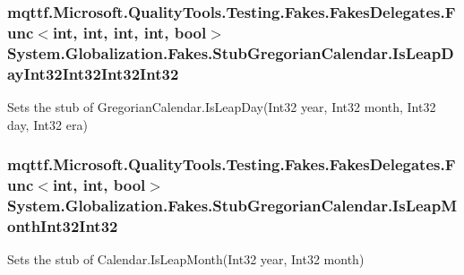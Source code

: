 \hypertarget{class_system_1_1_globalization_1_1_fakes_1_1_stub_gregorian_calendar_aa51d4ee07fc7c592589da3bd70db93f2}{
\subsubsection[{Is\-Leap\-Day\-Int32\-Int32\-Int32\-Int32}]{\setlength{\rightskip}{0pt plus 5cm}mqttf.\-Microsoft.\-Quality\-Tools.\-Testing.\-Fakes.\-Fakes\-Delegates.\-Func$<$int, int, int, int, bool$>$ System.\-Globalization.\-Fakes.\-Stub\-Gregorian\-Calendar.\-Is\-Leap\-Day\-Int32\-Int32\-Int32\-Int32}}\label{class_system_1_1_globalization_1_1_fakes_1_1_stub_gregorian_calendar_aa51d4ee07fc7c592589da3bd70db93f2}


Sets the stub of Gregorian\-Calendar.\-Is\-Leap\-Day(\-Int32 year, Int32 month, Int32 day, Int32 era)

\hypertarget{class_system_1_1_globalization_1_1_fakes_1_1_stub_gregorian_calendar_af66d360fdbf0cc9ce9ebfa897735b65a}{
\subsubsection[{Is\-Leap\-Month\-Int32\-Int32}]{\setlength{\rightskip}{0pt plus 5cm}mqttf.\-Microsoft.\-Quality\-Tools.\-Testing.\-Fakes.\-Fakes\-Delegates.\-Func$<$int, int, bool$>$ System.\-Globalization.\-Fakes.\-Stub\-Gregorian\-Calendar.\-Is\-Leap\-Month\-Int32\-Int32}}\label{class_system_1_1_globalization_1_1_fakes_1_1_stub_gregorian_calendar_af66d360fdbf0cc9ce9ebfa897735b65a}


Sets the stub of Calendar.\-Is\-Leap\-Month(\-Int32 year, Int32 month)

